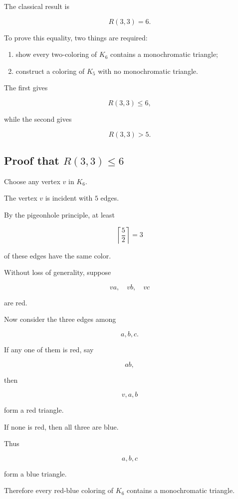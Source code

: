 The classical result is

\[
\boxed{
R(3,3)=6.
}
\]

To prove this equality, two things are required:

\begin{enumerate}
    \item show every two-coloring of \(K_6\) contains a monochromatic
          triangle;
    \item construct a coloring of \(K_5\) with no monochromatic
          triangle.
\end{enumerate}

The first gives

\[
R(3,3)\leq6,
\]

while the second gives

\[
R(3,3)>5.
\]

\subsection{Proof that \(R(3,3)\leq6\)}
\label{subsec:ramsey-33-upper}

Choose any vertex \(v\) in \(K_6\).

The vertex \(v\) is incident with \(5\) edges.

By the pigeonhole principle, at least

\[
\left\lceil\frac52\right\rceil=3
\]

of these edges have the same color.

Without loss of generality, suppose

\[
va,\quad vb,\quad vc
\]

are red.

Now consider the three edges among

\[
a,b,c.
\]

If any one of them is red, say

\[
ab,
\]

then

\[
v,a,b
\]

form a red triangle.

If none is red, then all three are blue.

Thus

\[
a,b,c
\]

form a blue triangle.

Therefore every red-blue coloring of \(K_6\) contains a monochromatic
triangle.

